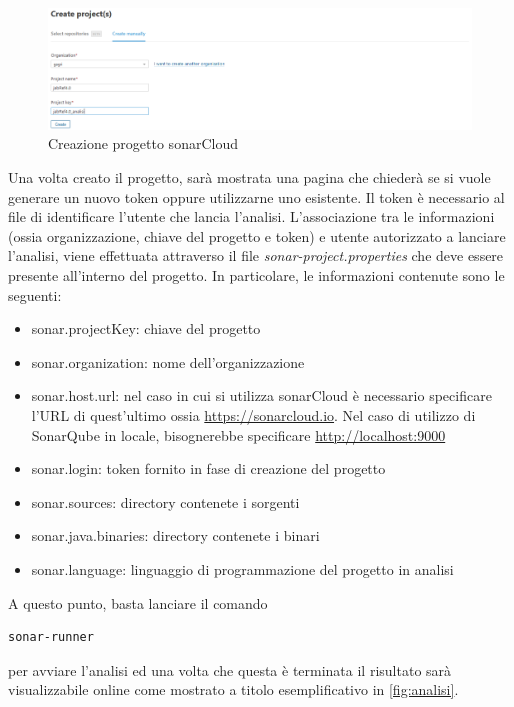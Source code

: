 \begin{figure}[htbp]
	\centering
	\includegraphics[scale=0.3, trim = 0cm 0cm 0cm 0cm, clip=true]{figSonarCloud/progetto.PNG}
	\caption{Creazione progetto sonarCloud}
	\label{fig:prog}
\end{figure}
Una volta creato il progetto, sarà mostrata una pagina che chiederà se si vuole generare un nuovo token oppure utilizzarne uno esistente. Il token è necessario al file di identificare l'utente che lancia l'analisi. L'associazione tra le informazioni (ossia organizzazione, chiave del progetto e token) e utente autorizzato a lanciare l'analisi, viene effettuata attraverso il file \textit{sonar-project.properties} che deve essere presente all'interno del progetto. In particolare, le informazioni contenute sono le seguenti:
\begin{itemize}
	\item 	sonar.projectKey: chiave del progetto
	\item 	sonar.organization: nome dell'organizzazione
	\item 	sonar.host.url: nel caso in cui si utilizza sonarCloud è necessario specificare l'URL di quest'ultimo ossia \url{https://sonarcloud.io}. Nel caso di utilizzo di SonarQube in locale, bisognerebbe specificare \url{http://localhost:9000}
	\item 	sonar.login: token fornito in fase di creazione del progetto
	\item sonar.sources: directory contenete i sorgenti
	\item sonar.java.binaries: directory contenete i binari
	\item sonar.language: linguaggio di programmazione del progetto in analisi
\end{itemize}

A questo punto, basta lanciare il comando 
\begin{verbatim}
sonar-runner
\end{verbatim}
per avviare l'analisi ed una volta che questa è terminata il risultato sarà visualizzabile online come mostrato a titolo esemplificativo in \autoref{fig:analisi}.
	
